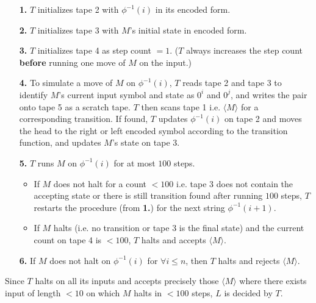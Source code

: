 \documentclass[12pt]{article}
\begin{document}
\begin{enumerate}
  \item[\textbf{1.}] \(T\) initializes tape 2 with \(\phi^{-1}(i)\) in its encoded form.
  \item[\textbf{2.}] \(T\) initializes tape 3 with \(M\)'s initial state in encoded form.
  \item[\textbf{3.}] \(T\) initializes tape 4 as step count \(= 1\). (\(T\) always increases the step count \textbf{before} running one move of \(M\) on the input.)
  \item[\textbf{4.}] To simulate a move of \(M\) on \(\phi^{-1}(i)\), \(T\) reads tape 2 and tape 3 to identify \(M\)'s current input symbol and state as \(0^i\) and \(0^j\), and writes the pair onto tape 5 as a scratch tape. \(T\) then scans tape 1 i.e. \(\langle M \rangle\) for a corresponding transition. If found, \(T\) updates \(\phi^{-1}(i)\) on tape 2 and moves the head to the right or left encoded symbol according to the transition function, and updates \(M\)'s state on tape 3.
  \item[\textbf{5.}] \(T\) runs \(M\) on \(\phi^{-1}(i)\) for at most \(100\) steps. 
  \begin{itemize}
    \item If \(M\) does not halt for a count \(< 100\) i.e. tape 3 does not contain the accepting state or there is still transition found after running \(100\) steps, \(T\) restarts the procedure (from \textbf{1.}) for the next string \(\phi^{-1}(i+1)\). 
    \item If \(M\) halts (i.e. no transition or tape 3 is the final state) and the current count on tape 4 is \(< 100\), \(T\) halts and accepts \(\langle M \rangle\). 
  \end{itemize} 
  \item[\textbf{6.}] If \(M\) does not halt on \(\phi^{-1}(i)\) for \(\forall i \leq n\), then \(T\) halts and rejects \(\langle M \rangle\).
\end{enumerate}
Since \(T\) halts on all its inputs and accepts precisely those \(\langle M \rangle\) where there exists input of length \(< 10\) on which \(M\) halts in \(< 100\) steps, \(L\) is decided by \(T\).
\end{document}
